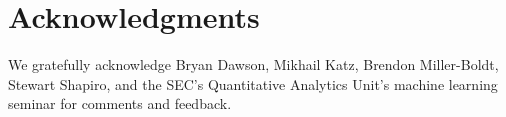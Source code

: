 \documentclass[reqno]{article}
\theoremstyle{definition}
\begin{document}
\section*{Acknowledgments}

We gratefully acknowledge Bryan Dawson, Mikhail Katz,
Brendon Miller-Boldt, Stewart Shapiro, and the
SEC's Quantitative Analytics Unit's machine learning seminar
for comments and feedback.



\end{document}
